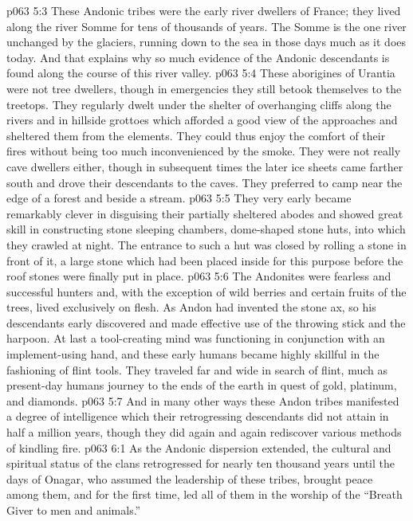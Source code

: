 \vs p063 5:3 These Andonic tribes were the early river dwellers of France; they lived along the river Somme for tens of thousands of years. The Somme is the one river unchanged by the glaciers, running down to the sea in those days much as it does today. And that explains why so much evidence of the Andonic descendants is found along the course of this river valley.
\vs p063 5:4 These aborigines of Urantia were not tree dwellers, though in emergencies they still betook themselves to the treetops. They regularly dwelt under the shelter of overhanging cliffs along the rivers and in hillside grottoes which afforded a good view of the approaches and sheltered them from the elements. They could thus enjoy the comfort of their fires without being too much inconvenienced by the smoke. They were not really cave dwellers either, though in subsequent times the later ice sheets came farther south and drove their descendants to the caves. They preferred to camp near the edge of a forest and beside a stream.
\vs p063 5:5 They very early became remarkably clever in disguising their partially sheltered abodes and showed great skill in constructing stone sleeping chambers, dome\hyp{}shaped stone huts, into which they crawled at night. The entrance to such a hut was closed by rolling a stone in front of it, a large stone which had been placed inside for this purpose before the roof stones were finally put in place.
\vs p063 5:6 The Andonites were fearless and successful hunters and, with the exception of wild berries and certain fruits of the trees, lived exclusively on flesh. As Andon had invented the stone ax, so his descendants early discovered and made effective use of the throwing stick and the harpoon. At last a tool\hyp{}creating mind was functioning in conjunction with an implement\hyp{}using hand, and these early humans became highly skillful in the fashioning of flint tools. They traveled far and wide in search of flint, much as present\hyp{}day humans journey to the ends of the earth in quest of gold, platinum, and diamonds.
\vs p063 5:7 And in many other ways these Andon tribes manifested a degree of intelligence which their retrogressing descendants did not attain in half a million years, though they did again and again rediscover various methods of kindling fire.
\vs p063 6:1 As the Andonic dispersion extended, the cultural and spiritual status of the clans retrogressed for nearly ten thousand years until the days of Onagar, who assumed the leadership of these tribes, brought peace among them, and for the first time, led all of them in the worship of the “Breath Giver to men and animals.”

